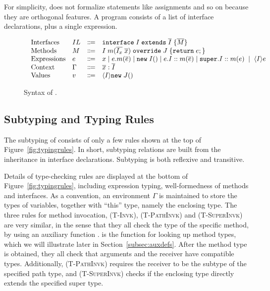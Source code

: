 For simplicity, \name{} does not formalize statements like assignments and so on because they are orthogonal features.
A program consists of a list of interface declarations, plus a single expression.

\begin{figure*}[t]
\begin{displaymath}
\begin{array}{l}
\begin{array}{llrl}
\text{Interfaces}   & IL & \Coloneqq & \texttt{interface} \; I \; \texttt{extends} \; \overline{I} \; {\{} \overline{M} {\}} \\
\text{Methods}      & M  & \Coloneqq & I \; m (\overline{I_x} \; \overline{x}) \; \texttt{override} \; J \; {\{} \texttt{return} \; e ; {\}} \\
\text{Expressions}  & e  & \Coloneqq & x \mid
e.m(\overline{e}) \mid
\texttt{new} \; I() \mid
e.I::m(\overline{e}) \mid
\texttt{super}.I::m(e) \; \mid \; \langle I \rangle e \\
\text{Context}      & \Gamma & \Coloneqq & \overline{x}:\overline{I} \\
\text{Values}       & v & \Coloneqq & \langle I \rangle \texttt{new} \; J() \\
\end{array}
\end{array}
\end{displaymath}
\caption{Syntax of \name{}.}\label{fig:syntax}
\end{figure*}

\subsection{Subtyping and Typing Rules}
The subtyping of \MIM{} consists of only a few rules shown at the top of Figure~\ref{fig:typingrules}.
In short, subtyping relations are built from the inheritance in interface
declarations. Subtyping is both reflexive and transitive.

Details of type-checking rules are displayed at the bottom of Figure~\ref{fig:typingrules}, including expression
typing, well-formedness of methods and interfaces. As a convention, an environment
$\Gamma$ is maintained to store the types of variables, together with ``this'' type, namely
the enclosing type. The three rules for method invocation, \textsc{(T-Invk)}, \textsc{(T-PathInvk)} and \textsc{(T-SuperInvk)}
are very similar, in the sense that they all check the type of the specific method, by using
an auxiliary function \mtype. \mtype{} is the function for looking up method types, which we will
illustrate later in Section~\ref{subsec:auxdefs}. After the method type is obtained, they all check that arguments and the receiver
have compatible types. Additionally, \textsc{(T-PathInvk)} requires the receiver to be the subtype of the specified
path type, and \textsc{(T-SuperInvk)} checks if the enclosing type directly extends the specified super type.

